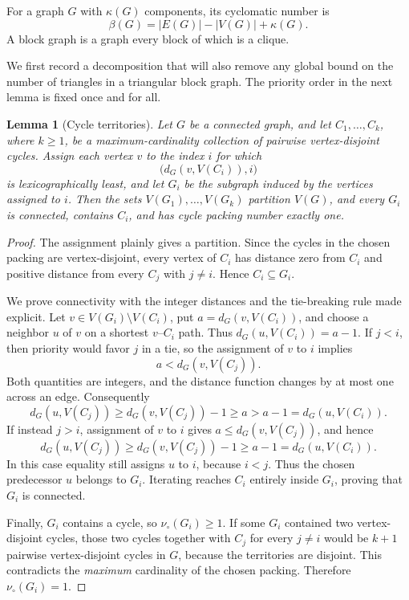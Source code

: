 \documentclass[11pt]{article}
\newtheorem{lemma}[theorem]{Lemma}
\theoremstyle{definition}
\theoremstyle{remark}
\newcommand{\vp}{\nu_{\circ}}
\begin{document}
For a graph $G$ with $\kappa(G)$ components, its cyclomatic number is
\[
 \beta(G)=|E(G)|-|V(G)|+\kappa(G).
\]
A block graph is a graph every block of which is a clique.

We first record a decomposition that will also remove any global bound on
the number of triangles in a triangular block graph.  The priority order in
the next lemma is fixed once and for all.

\begin{lemma}[Cycle territories]\label{lem:cycle-territories}
Let $G$ be a connected graph, and let $C_1,\ldots,C_k$, where $k\ge1$, be a
maximum-cardinality collection of pairwise vertex-disjoint cycles.  Assign
each vertex $v$ to the index $i$ for which
\[
 \bigl(d_G(v,V(C_i)),i\bigr)
\]
is lexicographically least, and let $G_i$ be the subgraph induced by the
vertices assigned to $i$.  Then the sets $V(G_1),\ldots,V(G_k)$ partition
$V(G)$, and every $G_i$ is connected, contains $C_i$, and has cycle packing
number exactly one.
\end{lemma}

\begin{proof}
The assignment plainly gives a partition.  Since the cycles in the chosen
packing are vertex-disjoint, every vertex of $C_i$ has distance zero from
$C_i$ and positive distance from every $C_j$ with $j\ne i$.  Hence
$C_i\subseteq G_i$.

We prove connectivity with the integer distances and the tie-breaking rule
made explicit.  Let $v\in V(G_i)\setminus V(C_i)$, put
$a=d_G(v,V(C_i))$, and choose a neighbor $u$ of $v$ on a shortest
$v$--$C_i$ path.  Thus $d_G(u,V(C_i))=a-1$.  If $j<i$, then priority would
favor $j$ in a tie, so the assignment of $v$ to $i$ implies
\[
 a<d_G(v,V(C_j)).
\]
Both quantities are integers, and the distance function changes by at most
one across an edge.  Consequently
\[
 d_G(u,V(C_j))\ge d_G(v,V(C_j))-1\ge a
 >a-1=d_G(u,V(C_i)).
\]
If instead $j>i$, assignment of $v$ to $i$ gives
$a\le d_G(v,V(C_j))$, and hence
\[
 d_G(u,V(C_j))\ge d_G(v,V(C_j))-1\ge a-1
 =d_G(u,V(C_i)).
\]
In this case equality still assigns $u$ to $i$, because $i<j$.  Thus the
chosen predecessor $u$ belongs to $G_i$.  Iterating reaches $C_i$ entirely
inside $G_i$, proving that $G_i$ is connected.

Finally, $G_i$ contains a cycle, so $\vp(G_i)\ge1$.  If some $G_i$ contained
two vertex-disjoint cycles, those two cycles together with $C_j$ for every
$j\ne i$ would be $k+1$ pairwise vertex-disjoint cycles in $G$, because the
territories are disjoint.  This contradicts the \emph{maximum} cardinality
of the chosen packing.  Therefore $\vp(G_i)=1$.
\end{proof}
\end{document}
